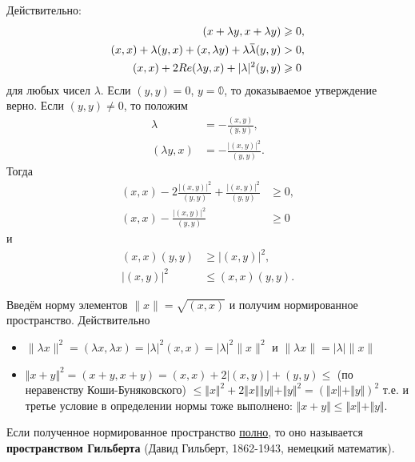 \documentclass[12pt,a4paper,titlepage,oneside]{book}
\newcommand{\overbar}[1]{\mkern 1.5mu\overline{\mkern-1.5mu#1\mkern-1.5mu}\mkern 1.5mu}
\theoremstyle{definition}
\theoremstyle{plain}
\theoremstyle{break}
\theoremstyle{remark}
\theoremstyle{remark}
\theoremstyle{remark}
\theoremstyle{remark}
\theoremstyle{plain}
\theoremstyle{plain}
\begin{document}
Действительно:
\begin{align*}
(x + \lambda y, x + \lambda y) &\geqslant 0,\\
(x, x) + \lambda (y, x) + (x, \lambda y) + \lambda \overbar{\lambda} (y, y) &> 0,\\
(x,x) + 2 Re(\lambda y, x) + \lvert \lambda \rvert^2 (y, y) &\geqslant 0\\
\end{align*}
для любых чисел $\lambda$.
Если $(y, y) = 0$, $y = \mathbb{0}$, то доказываемое утверждение верно. Если $(y, y) \neq 0$, то положим 
\begin{align*}
\lambda &= - \frac{(x, y)}{(y, y)},\\
(\lambda y, x) &= - \frac{ \lvert (x, y)\rvert^2}{(y, y)}.
\end{align*}
Тогда
\begin{align*}
(x, x) - 2 \frac{ \lvert (x, y) \rvert^2}{(y, y)} + \frac{\lvert (x, y) \rvert^2}{(y, y)} &\geqslant 0,\\
(x, x) - \frac{\lvert (x, y) \rvert^2}{(y, y)} &\geqslant 0
\end{align*}
и
\begin{align*}
(x, x) (y, y) &\geqslant \lvert (x, y) \rvert^2,\\
\lvert (x, y) \rvert^2 &\leqslant (x, x) (y, y).
\end{align*}

Введём норму элементов $\lVert x \rVert = \sqrt{(x, x)}$ и получим нормированное пространство. Действительно

\begin{itemize}

	\item $\lVert \lambda x \rVert^2 = (\lambda x, \lambda x) = \lvert \lambda \rvert^2 (x, x) = \lvert \lambda \rvert^2 \lVert x \rVert^2$ и $\lVert \lambda x \rVert = \lvert \lambda \rvert \lVert x \rVert$
	
	\item $\Vert x + y \Vert^2 = (x + y, x + y) = (x, x) + 2 \lvert (x, y) \rvert + (y, y) \leqslant$ (по неравенству Коши-Буняковского) $\leqslant \Vert x \Vert^2 + 2 \Vert x \Vert \Vert y \Vert + \Vert y \Vert^2 = (\Vert x \Vert + \Vert y \Vert)^2$ т.е. и третье условие в определении нормы тоже выполнено: $\Vert x + y \Vert \leqslant \Vert x \Vert + \Vert y \Vert$.

\end{itemize}

Если полученное нормированное пространство \underline{полно}, то оно называется \textbf{пространством Гильберта} (Давид Гильберт, 1862-1943, немецкий математик).
\end{document}
